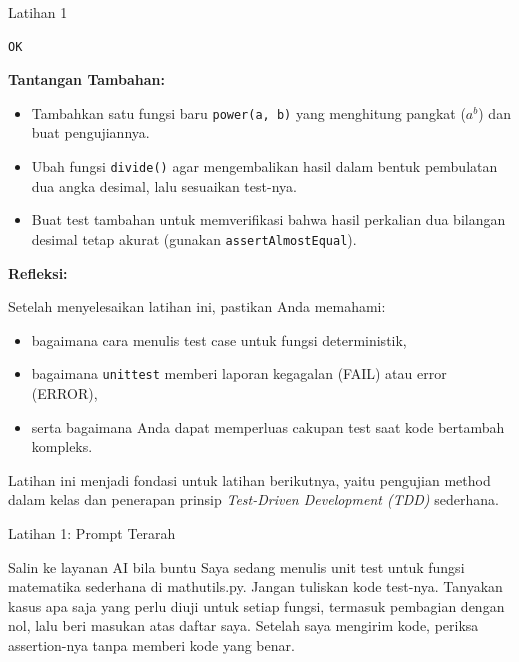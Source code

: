 \documentclass[aspectratio=169, table]{beamer}
\begin{document}
\begin{frame}[fragile,allowframebreaks=0.8]{Latihan 1}
\begin{lstlisting}[language=bash, breaklines=true, basicstyle=\ttfamily\scriptsize]
OK
\end{lstlisting}

\medskip\textbf{Tantangan Tambahan:}\par 
\begin{itemize}
    \item Tambahkan satu fungsi baru \texttt{power(a, b)} yang menghitung pangkat (\( a^b \)) dan buat pengujiannya.
    \item Ubah fungsi \texttt{divide()} agar mengembalikan hasil dalam bentuk pembulatan dua angka desimal, lalu sesuaikan test-nya.
    \item Buat test tambahan untuk memverifikasi bahwa hasil perkalian dua bilangan desimal tetap akurat (gunakan \texttt{assertAlmostEqual}).
\end{itemize}

\medskip\textbf{Refleksi:}\par 
Setelah menyelesaikan latihan ini, pastikan Anda memahami:
\begin{itemize}
    \item bagaimana cara menulis test case untuk fungsi deterministik,
    \item bagaimana \texttt{unittest} memberi laporan kegagalan (FAIL) atau error (ERROR),
    \item serta bagaimana Anda dapat memperluas cakupan test saat kode bertambah kompleks.
\end{itemize}

Latihan ini menjadi fondasi untuk latihan berikutnya, yaitu pengujian method dalam kelas dan penerapan prinsip \textit{Test-Driven Development (TDD)} sederhana.
\end{frame}

\begin{frame}{Latihan 1: Prompt Terarah}
\begin{block}{Salin ke layanan AI bila buntu}
\small Saya sedang menulis unit test untuk fungsi matematika sederhana di mathutils.py. Jangan tuliskan kode test-nya. Tanyakan kasus apa saja yang perlu diuji untuk setiap fungsi, termasuk pembagian dengan nol, lalu beri masukan atas daftar saya. Setelah saya mengirim kode, periksa assertion-nya tanpa memberi kode yang benar.
\end{block}
\end{frame}
\end{document}
